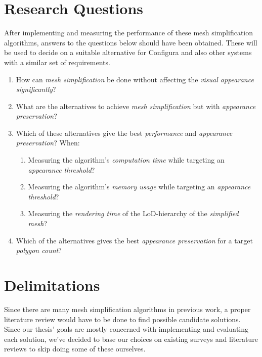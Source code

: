 \section{Research Questions}
\label{sec:research-questions}

After implementing and measuring the performance of these mesh simplification algorithms, answers to the questions below should have been obtained. These will be used to decide on a suitable alternative for Configura and also other systems with a similar set of requirements.

\begin{enumerate}
    \item How can \emph{mesh simplification} be done without affecting the \emph{visual appearance significantly}?

\item What are the alternatives to achieve \emph{mesh simplification} but with \emph{appearance preservation}?

\item{Which of these alternatives give the best \emph{performance} and \emph{appearance preservation}? When:
  \begin{enumerate}
  \item Measuring the algorithm's \emph{computation time} while targeting an \emph{appearance threshold}?
  \item Measuring the algorithm's \emph{memory usage} while targeting an \emph{appearance threshold}?
  \item Measuring the \emph{rendering time} of the LoD-hierarchy of the \emph{simplified mesh}?
  \end{enumerate}
}
\item Which of the alternatives gives the best \emph{appearance preservation} for a target \emph{polygon count}?
\end{enumerate}


\section{Delimitations}
\label{sec:delimitations}

Since there are many mesh simplification algorithms in previous work, a proper literature review would have to be done to find possible candidate solutions. Since our thesis' goals are mostly concerned with implementing and evaluating each solution, we've decided to base our choices on existing surveys and literature reviews to skip doing some of these ourselves.


